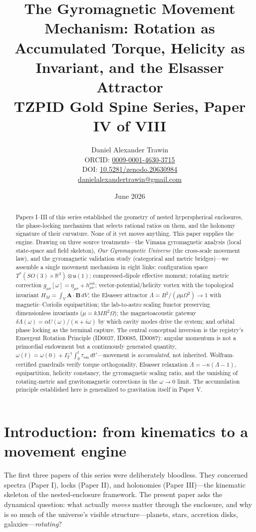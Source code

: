 \documentclass[11pt]{article}
\title{The Gyromagnetic Movement Mechanism: Rotation as Accumulated Torque, Helicity as Invariant, and the Elsasser Attractor\\[0.6em]
\large TZPID Gold Spine Series, Paper IV of VIII}
\author{Daniel Alexander Trawin\\
\small ORCID: \href{https://orcid.org/0009-0001-4630-3715}{0009-0001-4630-3715}\\
\small DOI: \href{https://doi.org/10.5281/zenodo.20630984}{10.5281/zenodo.20630984}\\
\small \href{mailto:danielalexandertrawin@gmail.com}{danielalexandertrawin@gmail.com}}
\date{June 2026}
\theoremstyle{remark}
\begin{document}
\maketitle

\begin{abstract}
Papers I--III of this series established the geometry of nested hyperspherical enclosures, the phase-locking mechanism that selects rational ratios on them, and the holonomy signature of their curvature. None of it yet moves anything. This paper supplies the engine. Drawing on three source treatments---the Vimana gyromagnetic analysis (local state-space and field skeleton), \emph{Our Gyromagnetic Universe} (the cross-scale movement law), and the gyromagnetic validation study (categorical and metric bridges)---we assemble a single movement mechanism in eight links: configuration space $T^*(SO(3) \times \mathbb{R}^3) \otimes \mathfrak{u}(1)$; compressed-dipole effective moment; rotating metric correction $g_{\mu\nu}[\omega] = \eta_{\mu\nu} + h^{\mathrm{rot}}_{\mu\nu}$; vector-potential/helicity vortex with the topological invariant $H_M = \int_V \mathbf{A} \cdot \mathbf{B}\, dV$; the Elsasser attractor $\Lambda = B^2/(\rho\mu\Omega^2) \to 1$ with magnetic--Coriolis equipartition; the lab-to-astro scaling functor preserving dimensionless invariants ($\mu = kMR^2\Omega$); the magnetoacoustic gateway $\delta\Lambda(\omega) = \alpha U(\omega)/(\kappa + i\omega)$ by which cavity modes drive the system; and orbital phase locking as the terminal capture. The central conceptual inversion is the registry's Emergent Rotation Principle (ID0037, ID0085, ID0087): angular momentum is not a primordial endowment but a continuously generated quantity, $\omega(t) = \omega(0) + I_T^{-1}\int_0^t \tau_{\mathrm{em}}\, dt'$---movement is \emph{accumulated}, not inherited. Wolfram-certified guardrails verify torque orthogonality, Elsasser relaxation $\dot{\Lambda} = -\kappa(\Lambda - 1)$, equipartition, helicity constancy, the gyromagnetic scaling ratio, and the vanishing of rotating-metric and gravitomagnetic corrections in the $\omega \to 0$ limit. The accumulation principle established here is generalized to gravitation itself in Paper V.
\end{abstract}

\section{Introduction: from kinematics to a movement engine}
\label{sec:intro}

The first three papers of this series were deliberately bloodless. They concerned spectra (Paper I), locks (Paper II), and holonomies (Paper III)---the kinematic skeleton of the nested-enclosure framework. The present paper asks the dynamical question: what actually \emph{moves} matter through the enclosure, and why is so much of the universe's visible structure---planets, stars, accretion disks, galaxies---\emph{rotating}?
\end{document}
